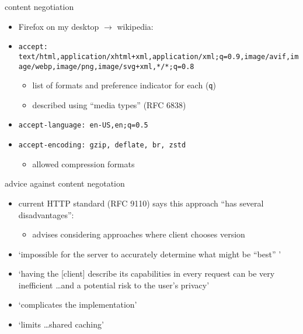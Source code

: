 \begin{frame}{content negotiation}
\begin{itemize}
\item Firefox on my desktop $\rightarrow$ wikipedia:
\item {\small\texttt{accept: text/html,application/xhtml+xml,application/xml;q=0.9,image/avif,image/webp,image/png,image/svg+xml,*/*;q=0.8}}
    \begin{itemize}
    \item list of formats and preference indicator for each (\texttt{q})
    \item described using ``media types'' (RFC 6838)
    \end{itemize}
\item {\small\texttt{accept-language: en-US,en;q=0.5}}
\item {\small\texttt{accept-encoding: gzip, deflate, br, zstd}}
    \begin{itemize}
    \item allowed compression formats
    \end{itemize}
\end{itemize}
\end{frame}

\begin{frame}{advice against content negotation}
\begin{itemize}
\item current HTTP standard (RFC 9110) says this approach ``has several disadvantages'':
    \begin{itemize}
    \item advises considering approaches where client chooses version
    \end{itemize}
\item `impossible for the server to accurately determine what might be ``best'' '
\item `having the [client] describe its capabilities in every request can be very inefficient \ldots and a potential risk to the user's privacy'
\item `complicates the implementation'
\item `limits \ldots shared caching'
\end{itemize}
\end{frame}
